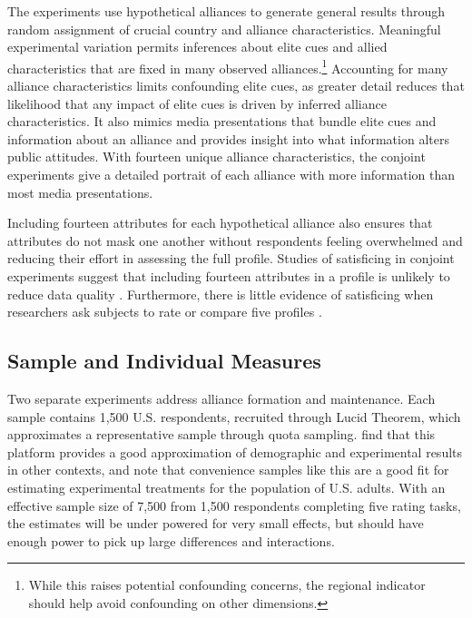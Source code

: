 \documentclass[12pt]{article}
\begin{document}
The experiments use hypothetical alliances to generate general results through random assignment of crucial country and alliance characteristics. 
Meaningful experimental variation permits inferences about elite cues and allied characteristics that are fixed in many observed alliances.\footnote{While this raises potential confounding concerns, the regional indicator should help avoid confounding on other dimensions.}
Accounting for many alliance characteristics limits confounding elite cues, as greater detail reduces that likelihood that any impact of elite cues is driven by inferred alliance characteristics.
It also mimics media presentations that bundle elite cues and information about an alliance and provides insight into what information alters public attitudes. 
With fourteen unique alliance characteristics, the conjoint experiments give a detailed portrait of each alliance with more information than most media presentations.


Including fourteen attributes for each hypothetical alliance also ensures that attributes do not mask one another without respondents feeling overwhelmed and reducing their effort in assessing the full profile.
Studies of satisficing in conjoint experiments suggest that including fourteen attributes in a profile is unlikely to reduce data quality \citep{Bansaketal2019}. 
Furthermore, there is little evidence of satisficing when researchers ask subjects to rate or compare five profiles \citep{Bansaketal2018}.



\subsection{Sample and Individual Measures}


Two separate experiments address alliance formation and maintenance. 
Each sample contains 1,500 U.S. respondents, recruited through Lucid Theorem, which approximates a representative sample through quota sampling.
\citet{CoppockMcClellan2019} find that this platform provides a good approximation of demographic and experimental results in other contexts, and note that convenience samples like this are a good fit for estimating experimental treatments for the population of U.S. adults.
With an effective sample size of 7,500 from 1,500 respondents completing five rating tasks, the estimates will be under powered for very small effects, but should have enough power to pick up large differences and interactions. 
\end{document}
